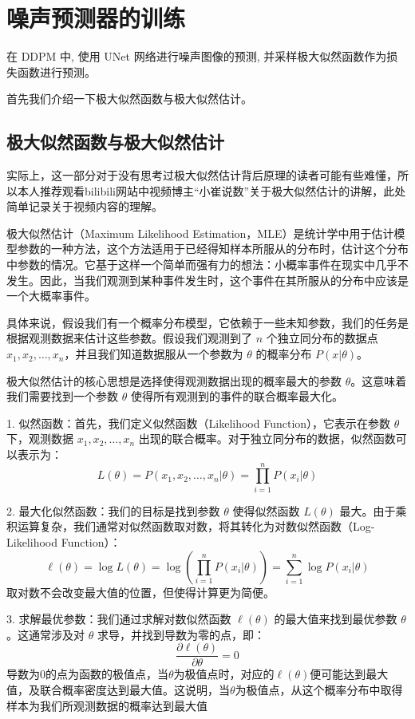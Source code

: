 \section{噪声预测器的训练}

在 DDPM 中, 使用 UNet 网络进行噪声图像的预测, 并采样极大似然函数作为损失函数进行预测。

首先我们介绍一下极大似然函数与极大似然估计。

\subsection{极大似然函数与极大似然估计}

实际上，这一部分对于没有思考过极大似然估计背后原理的读者可能有些难懂，所以本人推荐观看bilibili网站中视频博主“小崔说数”关于极大似然估计的讲解\cite{XiaoCuiShuoShuShiFenZhongGaoDingZuiDaSiRanGuJi2021}，此处简单记录关于视频内容的理解。

极大似然估计（Maximum Likelihood Estimation，MLE）是统计学中用于估计模型参数的一种方法，这个方法适用于已经得知样本所服从的分布时，估计这个分布中参数的情况。它基于这样一个简单而强有力的想法：小概率事件在现实中几乎不发生。因此，当我们观测到某种事件发生时，这个事件在其所服从的分布中应该是一个大概率事件。

具体来说，假设我们有一个概率分布模型，它依赖于一些未知参数，我们的任务是根据观测数据来估计这些参数。假设我们观测到了 \(n\) 个独立同分布的数据点 \(x_1, x_2, \ldots, x_n\)，并且我们知道数据服从一个参数为 \(\theta\) 的概率分布 \(P(x|\theta)\)。

极大似然估计的核心思想是选择使得观测数据出现的概率最大的参数 \(\theta\)。这意味着我们需要找到一个参数 \(\theta\) 使得所有观测到的事件的联合概率最大化。

1. 似然函数：首先，我们定义似然函数（Likelihood Function），它表示在参数 \(\theta\) 下，观测数据 \(x_1, x_2, \ldots, x_n\) 出现的联合概率。对于独立同分布的数据，似然函数可以表示为：
   \[
   L(\theta) = P(x_1, x_2, \ldots, x_n | \theta) = \prod_{i=1}^n P(x_i | \theta)
   \]

2. 最大化似然函数：我们的目标是找到参数 \(\theta\) 使得似然函数 \(L(\theta)\) 最大。由于乘积运算复杂，我们通常对似然函数取对数，将其转化为对数似然函数（Log-Likelihood Function）：
   \[
   \ell(\theta) = \log L(\theta) = \log \left( \prod_{i=1}^n P(x_i | \theta) \right) = \sum_{i=1}^n \log P(x_i | \theta)
   \]
   取对数不会改变最大值的位置，但使得计算更为简便。

3. 求解最优参数：我们通过求解对数似然函数 \(\ell(\theta)\) 的最大值来找到最优参数 \(\theta\)。这通常涉及对 \(\theta\) 求导，并找到导数为零的点，即：
   \[
   \frac{\partial \ell(\theta)}{\partial \theta} = 0
   \]
   导数为$0$的点为函数的极值点，当$\theta$为极值点时，对应的$\ell(\theta)$便可能达到最大值，及联合概率密度达到最大值。这说明，当$\theta$为极值点，从这个概率分布中取得样本为我们所观测数据的概率达到最大值

